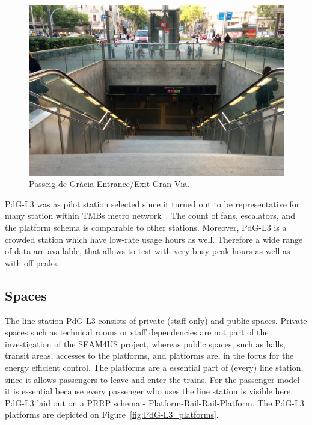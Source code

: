 \begin{figure}%
  \centering
  \includegraphics[width=\linewidth]{Figures/PdG-L3_entranceExit.jpg} 
  \caption{Passeig de Gr\`{a}cia Entrance/Exit Gran Via. \cite{TMB_2014}}
  \label{fig:PdG_entranceExit}
\end{figure}

PdG-L3 was as pilot station selected since it turned out to be representative for many station within TMBs metro network~\cite{TMB_2014}. The count of fans, escalators, and the platform schema is comparable to other stations. Moreover, PdG-L3 is a crowded station which have low-rate usage hours as well. Therefore a wide range of data are available, that allows to test with very busy peak hours as well as with off-peaks.


\subsection{Spaces}
\label{subsec:PdG-L3_spaces}

The line station PdG-L3 consists of private (staff only) and public spaces. Private spaces such as technical rooms or staff dependencies are not part of the investigation of the SEAM4US project, whereas public spaces, such as halls, transit areas, accesses to the platforms, and platforms are, in the focus for the energy efficient control.
The platforms are a essential part of (every) line station, since it allows passengers to leave and enter the trains. For the passenger model it is essential because every passenger who uses the line station is visible here. PdG-L3 laid out on a PRRP schema - Platform-Rail-Rail-Platform. The PdG-L3 platforms are depicted on Figure~\ref{fig:PdG-L3_platforms}.

